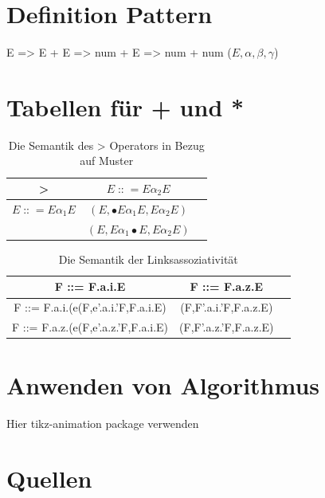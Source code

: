 \documentclass[t]{beamer}
\renewcommand{\Coloneqq}{\mathrel{\mathop{::}}=}
\begin{document}
    \section{Definition Pattern}
    \begin{frame}
        E => E + E => num + E => num + num
        ($E, \alpha, \beta, \gamma$)
    \end{frame}


    \section{Tabellen für + und *}
    \begin{frame}
        \begin{table}[h]
            \centering
            \caption{Die Semantik des > Operators in Bezug auf Muster}
            \begin{tabular}{|c|c|c|}
                \hline
                > & $E \Coloneqq E\alpha_{2}E$         \\
                \hline
                $E \Coloneqq E\alpha_{1}E$ & $(E, \bullet{E}\alpha_{1}E, {E}\alpha_{2}E)$ \\& $(E, E\alpha_{1}\bullet{E}, {E}\alpha_{2}E)$ \\
                \hline
            \end{tabular}\label{tab:table}
        \end{table}

        \begin{table}[h]
            \centering
            \caption{Die Semantik der Linksassoziativität}
            \begin{tabular}{|c|c|c|}
                \hline
                F ::= F.a.i.E                       & F ::= F.a.z.E         & \\
                \hline
                F ::= F.a.i.(e(F,e'.a.i.'F,F.a.i.E) & (F,F'.a.i.'F,F.a.z.E) & \\
                \hline
                F ::= F.a.z.(e(F,e'.a.z.'F,F.a.i.E) & (F,F'.a.z.'F,F.a.z.E) & \\
                \hline
            \end{tabular}\label{tab:table2}
        \end{table}

    \end{frame}


    \section{Anwenden von Algorithmus}
    \begin{frame}
        Hier tikz-animation package verwenden
    \end{frame}


    \section{Quellen}
    \begin{frame}[allowframebreaks]
        
        
    \end{frame}
\end{document}
